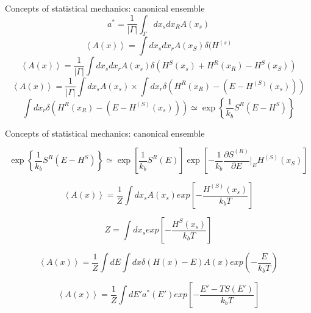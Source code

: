 \documentclass{beamer}
\begin{document}
\begin{frame}{Concepts of statistical mechanics: canonical ensemble}
\begin{equation}
a^{*}=\frac{1}{|\Gamma|}\int_{\Gamma}dx_{s}dx_{R} A(x_{s})
\end{equation}
\begin{equation}
\left\langle A(x) \right\rangle=\int dx_{s}dx_{r}A(x_{S})\delta(H^{(s)}
\end{equation}
\begin{equation}
\left\langle A(x) \right\rangle=\frac{1}{|\Gamma|}\int dx_{s}dx_{r}A(x_{s})\delta(H^{S}(x_{s})+H^{R}(x_{R})-H^{S}(x_{S}))
\end{equation}
\begin{equation}
\left\langle A(x) \right\rangle=\frac{1}{|\Gamma|}\int  dx_{s}A(x_{s})\times\int dx_{r}\delta(H^{R}(x_{R})-(E-H^{(S)}(x_{s})))
\end{equation}
\begin{equation}
\int dx_{r}\delta(H^{R}(x_{R})-(E-H^{(S)}(x_{s})))\simeq \exp\left\lbrace\frac{1}{k_{b}} S^{R}(E-H^{S})\right\rbrace
\end{equation}


\end{frame}


\begin{frame}{Concepts of statistical mechanics: canonical ensemble}

\begin{equation}
\exp\left\lbrace\frac{1}{k_{b}} S^{R}(E-H^{S})\right\rbrace \simeq  \exp \left[ \frac{1}{k_{b}}S^{R}(E)      \right] \exp\left[  -\frac{1}{k_{b}}\frac{\partial S^{(R)}}{\partial E}|_{E}  H^{(S)}(x_{S})  \right]
\end{equation}

\begin{equation}
\left\langle A(x) \right\rangle=\dfrac{1}{Z}\int dx_{s}A(x_{s})exp\left[ -\frac{H^{(S)}(x_{s})}{k_{b}T} \right]
\end{equation}

\begin{equation}
Z=\int dx_{s}exp\left[  -\frac{H^{S}(x_{s})}{k_{b}T}  \right]
\end{equation}


\begin{equation}
\left\langle A(x) \right\rangle=\dfrac{1}{Z}\int dE\int dx\delta(H(x)-E)A(x)exp(-\dfrac{E}{k_{b}T})
\end{equation}

\begin{equation}
\left\langle A(x) \right\rangle=\dfrac{1}{Z}\int dE'a^{*}(E')exp\left[ - \dfrac{E'-TS(E')}{k_{b}T}\right]
\end{equation}


\end{frame}
\end{document}
